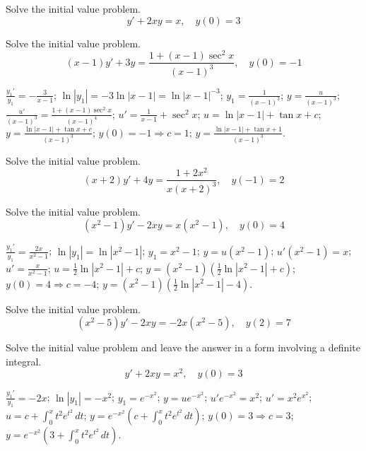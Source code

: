\documentclass{ximera}
\begin{document}
\begin{problem}\label{exer:2.1.33} Solve the initial value problem.
$$y'+2xy=x,\quad y(0)=3$$
\end{problem}

\begin{problem}\label{exer:2.1.34} Solve the initial value problem.
$$(x-1)y'+3y=\frac{1+(x-1)\sec^2x}{(x-1)^3},\quad y(0)=-1$$



\begin{solution}
    $\frac{y_1'}{ y_1}=-\frac{3}{ x-1}$;\quad
$\ln|y_1|=-3\ln|x-1|=\ln|x-1|^{-3}$;\quad
$y_1=\frac{1}{(x-1)^3}$;\quad
$y=\frac{u}{(x-1)^3}$;\quad
$\frac{u'}{(x-1)^3}=\frac{1+(x-1)\sec^2x}{(x-1)^4}$;\quad
$u'=\frac{1}{ x-1}+\sec^2x$;\quad
$u=\ln|x-1|+\tan x+c$;\quad
$y=\frac{\ln|x-1|+\tan x+c}{(x-1)^3}$;\quad
$y(0)=-1\Rightarrow c=1$;\quad
$y=\frac{\ln|x-1|+\tan
x+1}{(x-1)^3}$.
\end{solution}
\end{problem}

\begin{problem}\label{exer:2.1.35} Solve the initial value problem.
$$(x+2)y'+4y=\frac{1+2x^2}{x(x+2)^3},\quad y(-1)=2$$
\end{problem}

\begin{problem}\label{exer:2.1.36} Solve the initial value problem.
$$(x^2-1)y'-2xy=x(x^2-1),\quad y(0)=4$$



\begin{solution}
    $\frac{y_1'}{ y_1}=\frac{2x}{ x^2-1}$;\quad
$\ln|y_1|=\ln|x^2-1|$;\quad
$y_1=x^2-1$;\quad
$y=u(x^2-1)$;\quad
$u'(x^2-1)=x$;\quad
$u'=\frac{x}{ x^2-1}$;\quad
$u=\frac{1}{2}\ln|x^2-1|+c$;\quad
$y=(x^2-1)\left(\frac{1}{2}\ln|x^2-1|+c\right)$;\quad
$y(0)=4\Rightarrow c=-4$;\quad
$y=(x^2-1)\left(\frac{1}{2}\ln|x^2-1|-4\right)$.
\end{solution}
\end{problem}

\begin{problem}\label{exer:2.1.37} Solve the initial value problem.
$$(x^2-5)y'-2xy=-2x(x^2-5),\quad y(2)=7$$
\end{problem}

\begin{problem}\label{exer:2.1.38} Solve the initial value problem and leave the answer in a form involving a definite integral.
$$y'+2xy=x^2,\quad y(0)=3$$



\begin{solution}
    $\frac{y_1'}{ y_1}=-2x$;\quad
$\ln|y_1|=-x^2$;\quad
$y_1=e^{-x^2}$;\quad
$y=ue^{-x^2}$;\quad
$u'e^{-x^2}=x^2$;\quad
$u'=x^2e^{x^2}$;\quad
$u=c+{\int_0^xt^2e^{t^2}\,dt}$;\quad
$y=e^{-x^2}\left(c+{\int_0^xt^2e^{t^2}\,dt}\right)$;\quad
$y(0)=3\Rightarrow c=3$;\quad
$y=e^{-x^2}\left(3+{\int_0^xt^2e^{t^2}\,dt}\right)$.

\end{solution}
\end{problem}
\end{document}
